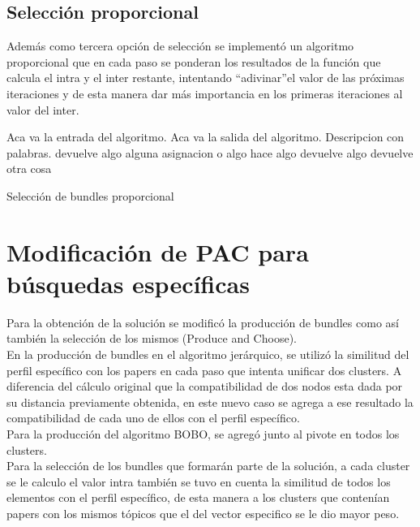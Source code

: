 \subsection{Selección proporcional}
Además como tercera opción de selección se implementó un algoritmo proporcional que en cada paso se 
ponderan los resultados de la función que calcula el intra y el inter restante, intentando 
\textquotedblleft adivinar\textquotedblright  el valor de las próximas iteraciones y de esta manera 
dar más importancia en los primeras iteraciones al valor del inter.
\begin{algorithm}[H]
\begin{algorithmic}[1]
\REQUIRE Aca va la entrada del algoritmo.
\ENSURE Aca va la salida del algoritmo.
\STATE Descripcion con palabras.
\RETURN devuelve algo
\ELSE
\STATE alguna asignacion o algo
\ENDIF
\ENDWHILE
{}
\STATE hace algo
\RETURN devuelve algo
\ENDIF
\ENDFOR
\RETURN devuelve otra cosa
\end{algorithmic}
\caption{Selección de bundles proporcional}\label{alg:algSelProp}
\end{algorithm}

\section{Modificación de PAC para búsquedas específicas}
Para la obtención de la solución se modificó la producción de bundles como así también la 
selección de los mismos (Produce and Choose). \\
En la producción de bundles en el algoritmo jerárquico, se utilizó la similitud del perfil 
específico con los papers en cada paso que intenta unificar dos clusters. A diferencia del cálculo 
original que la compatibilidad de dos nodos esta dada por su distancia previamente obtenida, en 
este nuevo caso se agrega a ese resultado la compatibilidad de cada uno de ellos con el perfil 
específico. \\
Para la producción del algoritmo BOBO, se agregó junto al pivote en todos los clusters. \\
Para la selección de los bundles que formarán parte de la solución, a cada cluster se le 
calculo el valor intra también se tuvo en cuenta la similitud de todos los elementos con el perfil  
específico, de esta manera a los clusters que contenían papers con los mismos tópicos que el del 
vector especifico se le dio mayor peso.

